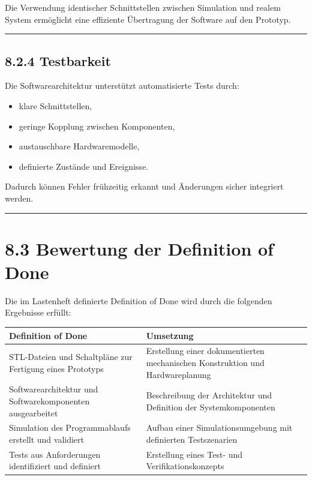 \documentclass[
]{article}
\providecommand{\tightlist}{%
  \setlength{\itemsep}{0pt}\setlength{\parskip}{0pt}}
\begin{document}
Die Verwendung identischer Schnittstellen zwischen Simulation und realem
System ermöglicht eine effiziente Übertragung der Software auf den
Prototyp.

\begin{center}\rule{0.5\linewidth}{0.5pt}\end{center}

\subsection{8.2.4 Testbarkeit}\label{testbarkeit}

Die Softwarearchitektur unterstützt automatisierte Tests durch:

\begin{itemize}
\tightlist
\item
  klare Schnittstellen,
\item
  geringe Kopplung zwischen Komponenten,
\item
  austauschbare Hardwaremodelle,
\item
  definierte Zustände und Ereignisse.
\end{itemize}

Dadurch können Fehler frühzeitig erkannt und Änderungen sicher
integriert werden.

\begin{center}\rule{0.5\linewidth}{0.5pt}\end{center}

\section{8.3 Bewertung der Definition of
Done}\label{bewertung-der-definition-of-done}

Die im Lastenheft definierte Definition of Done wird durch die folgenden
Ergebnisse erfüllt:

\begin{longtable}[]{@{}
  >{\raggedright\arraybackslash}p{}
  >{\raggedright\arraybackslash}p{}@{}}
\toprule\noalign{}
\begin{minipage}[b]{\linewidth}\raggedright
Definition of Done
\end{minipage} & \begin{minipage}[b]{\linewidth}\raggedright
Umsetzung
\end{minipage} \\
\midrule\noalign{}
\endhead
\bottomrule\noalign{}
\endlastfoot
STL-Dateien und Schaltpläne zur Fertigung eines Prototyps & Erstellung
einer dokumentierten mechanischen Konstruktion und Hardwareplanung \\
Softwarearchitektur und Softwarekomponenten ausgearbeitet & Beschreibung
der Architektur und Definition der Systemkomponenten \\
Simulation des Programmablaufs erstellt und validiert & Aufbau einer
Simulationsumgebung mit definierten Testszenarien \\
Tests aus Anforderungen identifiziert und definiert & Erstellung eines
Test- und Verifikationskonzepts \\
\end{longtable}
\end{document}
